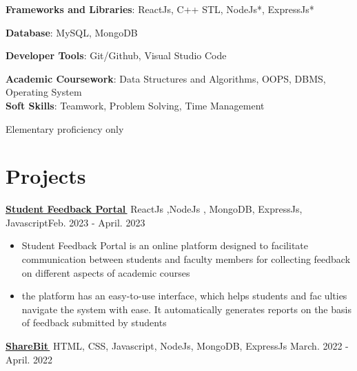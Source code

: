 \documentclass[letterpaper,11pt]{article}
\let\orighref\href
\renewcommand{\href}[2]{\orighref{#1}{#2\,\faExternalLink}}
\begin{document}
     \textbf{Frameworks and Libraries}{: ReactJs, C++ STL, NodeJs*, ExpressJs*}\\
     {
     \textbf{Database}{: MySQL, MongoDB }\\
     {
     \textbf{Developer Tools}{: Git/Github, Visual Studio Code }
     
     {
     \textbf{Academic Coursework}{: Data Structures and Algorithms, OOPS, DBMS, Operating System}\\
      \textbf{Soft Skills}{: Teamwork, Problem Solving, Time Management}
     
     {\vspace{4}\small*Elementary proficiency only}
     
    
      
   
 


\section{Projects}
 

   {  \textbf{\href{https://student-feedback-template-aibu-cnjkw6ge1-shankar9834.vercel.app/viewFeedbacks}{Student Feedback Portal}}   \mid ReactJs ,NodeJs , MongoDB, ExpressJs, Javascript\hfill {Feb. 2023 - April. 2023}}\\
    
     
      \smallskip
    \begin{itemize}[noitemsep]
   
        \item Student Feedback Portal is an online platform designed to facilitate
communication between students and faculty members for collecting
feedback on different aspects of academic courses
\item the platform has an easy-to-use interface, which helps students and faculties navigate the system with ease. It automatically generates reports on
the basis of feedback submitted by students
       
        
         
    \end{itemize}
    \smallskip
    \vspace{5}
    
    \textbf{\href{https://github.com/shankar9834/ShareBit}{ShareBit}}  \mid HTML, CSS, Javascript, NodeJs, MongoDB, ExpressJs \hfill {March. 2022 - April. 2022} \\
    
}}}
\end{document}
